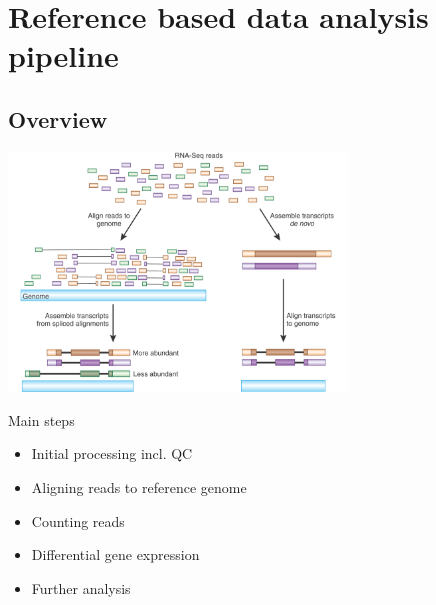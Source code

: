 \documentclass{beamer}\usepackage[]{graphicx}\usepackage[]{color}
\begin{document}
\section{Reference based data analysis pipeline}
\subsection{Overview}
\begin{frame}
\centering
\includegraphics[width=9cm]{Images/workflows.pdf}
\end{frame}

\begin{frame}
\begin{block}{Main steps}
\begin{itemize}
  \item Initial processing incl. QC
  \item Aligning reads to reference genome
  \item Counting reads
  \item Differential gene expression
  \item Further analysis
\end{itemize}
\end{block}
\end{frame}
\end{document}
